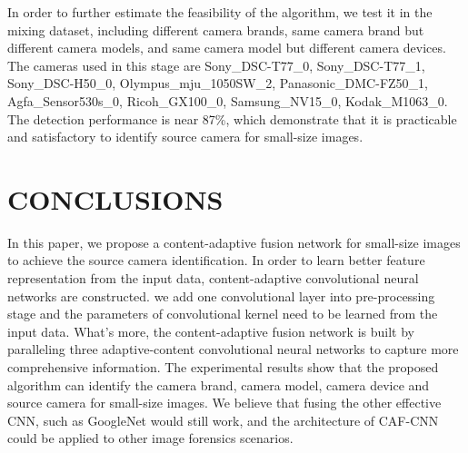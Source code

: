\documentclass{article}
\begin{document}
In order to further estimate the feasibility of the algorithm, we test it in the mixing dataset, including different camera brands, same camera brand but different camera models, and same camera model but different camera devices. The cameras used in this stage are Sony\_DSC-T77\_0, Sony\_DSC-T77\_1, Sony\_DSC-H50\_0,    Olympus\_mju\_1050SW\_2, Panasonic\_DMC-FZ50\_1, Agfa\_Sensor530s\_0, Ricoh\_GX100\_0, Samsung\_NV15\_0, Kodak\_M1063\_0. The detection performance is near 87\%, which demonstrate that it is practicable and satisfactory to identify source camera for small-size images. 







\section{CONCLUSIONS}
\label{sec:majhead}

In this paper, we propose a content-adaptive fusion network for small-size images to achieve the source camera identification. In order to learn better feature representation from the input data, content-adaptive convolutional neural networks are constructed. we add one convolutional layer into pre-processing stage and the parameters of convolutional kernel need to be learned from the input data. What's more, the content-adaptive fusion network is built by paralleling three adaptive-content convolutional neural networks to capture more comprehensive information. The experimental results show that the proposed algorithm can identify the camera brand, camera model, camera device and source camera for small-size images. We believe that fusing the other effective CNN, such as GoogleNet\cite{21} would still work, and the architecture of CAF-CNN could be applied to other image forensics scenarios.












\end{document}
